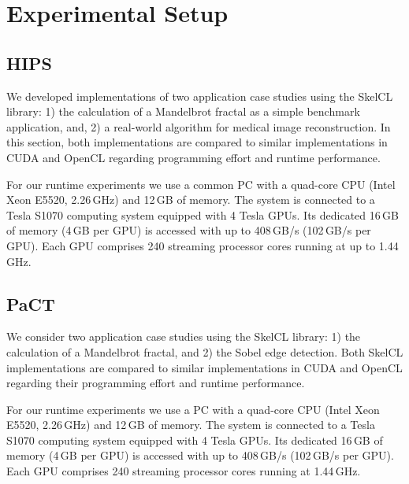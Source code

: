 \section{Experimental Setup}

\subsection{HIPS}
We developed implementations of two application case studies using the SkelCL library:
1) the calculation of a Mandelbrot fractal as a simple benchmark application, and, 2) a real-world algorithm for medical image reconstruction.
In this section, both implementations are compared to similar implementations in CUDA and OpenCL regarding programming effort and runtime performance.

For our runtime experiments we use a common PC with a quad-core CPU (Intel Xeon E5520, 2.26\,GHz) and 12\,GB of memory.
The system is connected to a Tesla S1070 computing system equipped with 4 Tesla GPUs.
Its dedicated 16\,GB of memory (4\,GB per GPU) is accessed with up to 408\,GB/s (102\,GB/s per GPU).
Each GPU comprises 240 streaming processor cores running at up to 1.44\,GHz.


\subsection{PaCT}
We consider two application case studies using the SkelCL library:
1) the calculation of a Mandelbrot fractal, and 2) the Sobel edge detection.
Both SkelCL implementations are compared to similar implementations in CUDA and OpenCL regarding their programming effort and runtime performance.

For our runtime experiments we use a PC with a quad-core CPU (Intel Xeon E5520, 2.26\,GHz) and 12\,GB of memory.
The system is connected to a Tesla S1070 computing system equipped with 4 Tesla GPUs.
Its dedicated 16\,GB of memory (4\,GB per GPU) is accessed with up to 408\,GB/s (102\,GB/s per GPU).
Each GPU comprises 240 streaming processor cores running at 1.44\,GHz.


